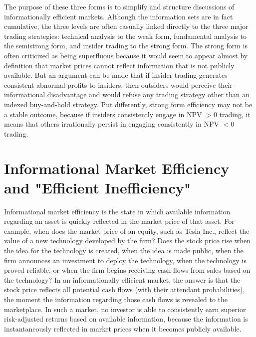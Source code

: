 \documentclass[11pt]{article}
\begin{document}
The purpose of these three forms is to simplify and structure discussions of informationally efficient markets. Although the information sets are in fact cumulative, the three levels are often casually linked directly to the three major trading strategies: technical analysis to the weak form, fundamental analysis to the semistrong form, and insider trading to the strong form. The strong form is often criticized as being superfluous because it would seem to appear almost by definition that market prices cannot reflect information that is not publicly available. But an argument can be made that if insider trading generates consistent abnormal profits to insiders, then outsiders would perceive their informational disadvantage and would refuse any trading strategy other than an indexed buy-and-hold strategy. Put differently, strong form efficiency may not be a stable outcome, because if insiders consistently engage in NPV $>0$ trading, it means that others irrationally persist in engaging consistently in NPV $<0$ trading.

\section*{Informational Market Efficiency and "Efficient Inefficiency"}
Informational market efficiency is the state in which available information regarding an asset is quickly reflected in the market price of that asset. For example, when does the market price of an equity, such as Tesla Inc., reflect the value of a new technology developed by the firm? Does the stock price rise when the idea for the technology is created, when the idea is made public, when the firm announces an investment to deploy the technology, when the technology is proved reliable, or when the firm begins receiving cash flows from sales based on the technology? In an informationally efficient market, the answer is that the stock price reflects all potential cash flows (with their attendant probabilities), the moment the information regarding those cash flows is revealed to the marketplace. In such a market, no investor is able to consistently earn superior risk-adjusted returns based on available information, because the information is instantaneously reflected in market prices when it becomes publicly available.
\end{document}
